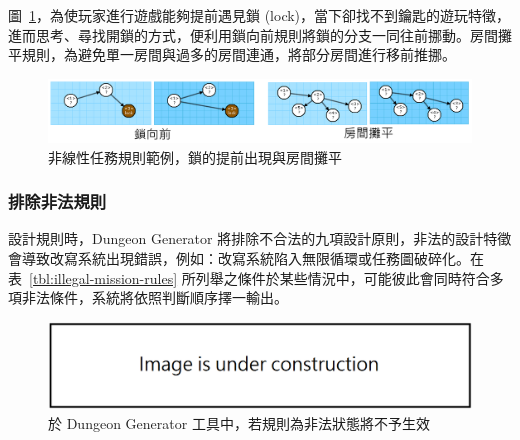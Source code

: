 圖~\ref{fig:missiongrammars-rules-nonlinear-example2}，為使玩家進行遊戲能夠提前遇見鎖 (lock)，當下卻找不到鑰匙的遊玩特徵，進而思考、尋找開鎖的方式，便利用鎖向前規則將鎖的分支一同往前挪動。房間攤平規則，為避免單一房間與過多的房間連通，將部分房間進行移前推挪。
 
\begin{figure}[ht]
  \begin{center}
    \includegraphics[width=1.0\textwidth]{figures/missiongrammars-rules-nonlinear-example2.png}
    \caption{非線性任務規則範例，鎖的提前出現與房間攤平}
    \label{fig:missiongrammars-rules-nonlinear-example2}
  \end{center}
\end{figure}



\subsubsection{排除非法規則}
\label{sssec:method-missiongrammars-rules-illegals}

設計規則時，Dungeon Generator 將排除不合法的九項設計原則，非法的設計特徵會導致改寫系統出現錯誤，例如：改寫系統陷入無限循環或任務圖破碎化。在表~\ref{tbl:illegal-mission-rules} 所列舉之條件於某些情況中，可能彼此會同時符合多項非法條件，系統將依照判斷順序擇一輸出。

\begin{figure}[ht]
  \begin{center}
    \includegraphics[width=1.0\textwidth]{figures/under_construction.png}
    \caption{於 Dungeon Generator 工具中，若規則為非法狀態將不予生效}
    \label{fig:missiongrammars-illegal-rules}
  \end{center}
\end{figure}

